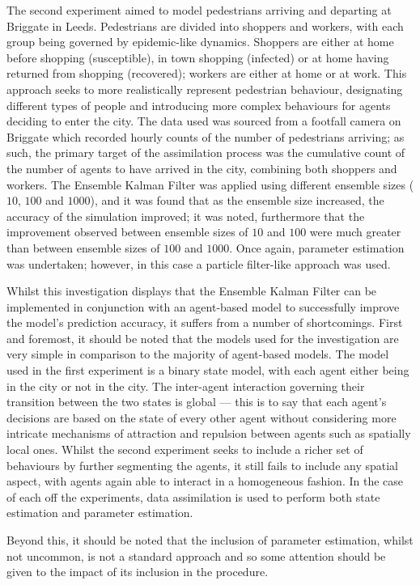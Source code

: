 The second experiment aimed to model pedestrians arriving and departing at
Briggate in Leeds.
Pedestrians are divided into shoppers and workers, with each group being
governed by epidemic-like dynamics.
Shoppers are either at home before shopping (susceptible), in town shopping
(infected) or at home having returned from shopping (recovered); workers are
either at home or at work.
This approach seeks to more realistically represent pedestrian behaviour,
designating different types of people and introducing more complex behaviours
for agents deciding to enter the city.
The data used was sourced from a footfall camera on Briggate which recorded
hourly counts of the number of pedestrians arriving; as such, the primary target
of the assimilation process was the cumulative count of the number of agents to
have arrived in the city, combining both shoppers and workers.
The Ensemble Kalman Filter was applied using different ensemble sizes ($10$,
$100$ and $1000$), and it was found that as the ensemble size increased, the
accuracy of the simulation improved; it was noted, furthermore that the
improvement observed between ensemble sizes of $10$ and $100$ were much greater
than between ensemble sizes of $100$ and $1000$.
Once again, parameter estimation was undertaken; however, in this case a
particle filter-like approach was used.

Whilst this investigation displays that the Ensemble Kalman Filter can be
implemented in conjunction with an agent-based model to successfully improve the
model's prediction accuracy, it suffers from a number of shortcomings.
First and foremost, it should be noted that the models used for the
investigation are very simple in comparison to the majority of agent-based
models.
The model used in the first experiment is a binary state model, with each agent
either being in the city or not in the city.
The inter-agent interaction governing their transition between the two states is
global --- this is to say that each agent's decisions are based on the state of
every other agent without considering more intricate mechanisms of attraction
and repulsion between agents \citep{helbing1995social} such as spatially local
ones.
Whilst the second experiment seeks to include a richer set of behaviours by
further segmenting the agents, it still fails to include any spatial aspect,
with agents again able to interact in a homogeneous fashion.
In the case of each off the experiments, data assimilation is used to perform
both state estimation and parameter estimation.

Beyond this, it should be noted that the inclusion of parameter estimation,
whilst not uncommon, is not a standard approach and so some attention should be
given to the impact of its inclusion in the procedure.


